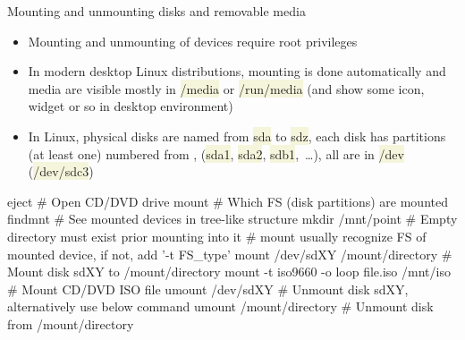 \documentclass[compress, xelatex, 11pt, xcolor=svgnames, aspectratio=169,
	hyperref={
		bookmarks=true,
		unicode=true,
		colorlinks=true,
		pdftitle={Linux, command line and MetaCentrum},
		plainpages=false,
		pdfauthor={Vojtech Zeisek},
		pdfsubject={Course about use of Linux command line, writing shell scripts and using MetaCentrum of CESNET},
		pdfcreator={XeLaTeX},
		pdfkeywords={Linux, GNU, BASH, shell, command line, MetaCentrum},
		linkcolor=DarkRed, %
		anchorcolor=DarkBlue, %
		citecolor=Indigo, %
		filecolor=NavyBlue, %
		menucolor=DarkMagenta, %
		urlcolor=DarkBlue, %
		},
	url={hyphens, lowtilde} %
	]{beamer}
\renewcommand{\texttt}[1]{\colorbox{Beige}{{\ttfamily #1}}}
\begin{document}
\begin{frame}[fragile]{Mounting and unmounting disks and removable media}
	\begin{itemize}
		\item Mounting and unmounting of devices require root privileges
		\item In modern desktop Linux distributions, mounting is done automatically and media are visible mostly in \texttt{/media} or \texttt{/run/media} (and show some icon, widget or so in desktop environment)
		\item In Linux, physical disks are named from \texttt{sda} to \texttt{sdz}, each disk has partitions (at least one) numbered from \texttt{1}, (\texttt{sda1}, \texttt{sda2}, \texttt{sdb1},~\ldots), all are in \texttt{/dev} (\texttt{/dev/sdc3})
	\end{itemize}
	\begin{bashcode}
    eject # Open CD/DVD drive
    mount # Which FS (disk partitions) are mounted
    findmnt # See mounted devices in tree-like structure
    mkdir /mnt/point # Empty directory must exist prior mounting into it
    # mount usually recognize FS of mounted device, if not, add '-t FS_type'
    mount /dev/sdXY /mount/directory # Mount disk sdXY to /mount/directory
    mount -t iso9660 -o loop file.iso /mnt/iso # Mount CD/DVD ISO file
    umount /dev/sdXY # Unmount disk sdXY, alternatively use below command
    umount /mount/directory # Unmount disk from /mount/directory
	\end{bashcode}
\end{frame}
\end{document}
